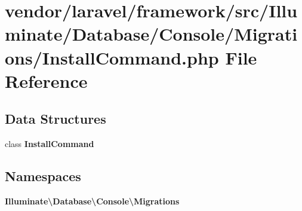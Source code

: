\section{vendor/laravel/framework/src/\+Illuminate/\+Database/\+Console/\+Migrations/\+Install\+Command.php File Reference}
\label{_install_command_8php}
\subsection*{Data Structures}
\begin{DoxyCompactItemize}
\item 
class {\bf Install\+Command}
\end{DoxyCompactItemize}
\subsection*{Namespaces}
\begin{DoxyCompactItemize}
\item 
 {\bf Illuminate\textbackslash{}\+Database\textbackslash{}\+Console\textbackslash{}\+Migrations}
\end{DoxyCompactItemize}

